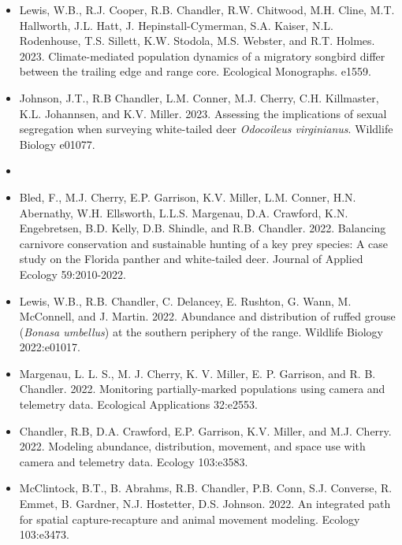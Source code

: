 \documentclass[12pt]{article}
\begin{document}
\begin{itemize}
\item Lewis, W.B., R.J. Cooper, R.B. Chandler, R.W. Chitwood,
  M.H. Cline, M.T. Hallworth, J.L. Hatt, J. Hepinstall-Cymerman,
  S.A. Kaiser, N.L. Rodenhouse, T.S. Sillett, K.W. Stodola,
  M.S. Webster, and R.T. Holmes. 2023. Climate-mediated population
  dynamics of a migratory songbird differ between the trailing edge
  and range core. Ecological Monographs. e1559. 

\item Johnson, J.T., R.B Chandler, L.M. Conner, M.J. Cherry,
  C.H. Killmaster, K.L. Johannsen, and K.V. Miller. 2023. Assessing
  the implications of sexual segregation when surveying white-tailed
  deer {\it Odocoileus virginianus}. Wildlife Biology e01077. 

  
\item[] { \\}

\item Bled, F., M.J. Cherry, E.P. Garrison, K.V. Miller, L.M. Conner,
  H.N. Abernathy, W.H. Ellsworth, L.L.S. Margenau, D.A. Crawford,
  K.N. Engebretsen, B.D. Kelly, D.B. Shindle, and
  R.B. Chandler. 2022. Balancing carnivore conservation and
  sustainable hunting of a  key prey species: A case study on the
  Florida panther and white‐tailed deer. Journal of Applied Ecology
  59:2010-2022. 
  
\item Lewis, W.B., R.B. Chandler, C. Delancey, E. Rushton, G. Wann, M.
  McConnell, and J. Martin. 2022. Abundance and distribution of
  ruffed grouse ({{\it Bonasa umbellus}}) at the southern periphery of
  the range. Wildlife Biology 2022:e01017. 

\item Margenau, L. L. S., M. J. Cherry, K. V. Miller, E. P. Garrison,
  and R. B. Chandler. 2022. Monitoring partially-marked
  populations using camera and telemetry data. Ecological
  Applications 32:e2553. 

\item Chandler, R.B, D.A. Crawford, E.P. Garrison, K.V. Miller, and
  M.J. Cherry. 2022. Modeling abundance, distribution, movement,
  and space use with camera and telemetry data. Ecology 103:e3583.  

\item McClintock, B.T., B. Abrahms, R.B. Chandler, P.B. Conn,
  S.J. Converse, R. Emmet, B. Gardner, N.J. Hostetter,
  D.S. Johnson. 2022. An integrated path for spatial
  capture-recapture and animal movement modeling. Ecology 103:e3473. 


\end{itemize}
\end{document}
